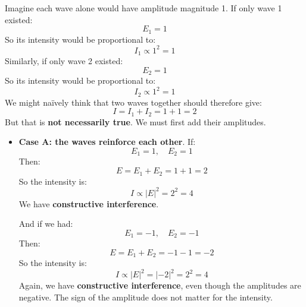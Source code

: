 \highspace
\begin{examplebox}
    Imagine each wave alone would have amplitude magnitude 1. If only wave 1 existed:
    \begin{equation*}
        E_1 = 1
    \end{equation*}
    So its intensity would be proportional to:
    \begin{equation*}
        I_1 \propto 1^{2} = 1
    \end{equation*}
    Similarly, if only wave 2 existed:
    \begin{equation*}
        E_2 = 1
    \end{equation*}
    So its intensity would be proportional to:
    \begin{equation*}
        I_2 \propto 1^{2} = 1
    \end{equation*}
    We might naïvely think that two waves together should therefore give:
    \begin{equation*}
        I = I_1 + I_2 = 1 + 1 = 2
    \end{equation*}
    But that is \textbf{not necessarily true}. We must first add their amplitudes.
    \begin{itemize}
        \item \textbf{Case A: the waves reinforce each other}. If:
            \begin{equation*}
                E_1 = 1, \quad E_2 = 1
            \end{equation*}
            Then:
            \begin{equation*}
                E = E_1 + E_2 = 1 + 1 = 2
            \end{equation*}
            So the intensity is:
            \begin{equation*}
                I \propto \left|E\right|^{2} = 2^{2} = 4
            \end{equation*}
            We have \textbf{constructive interference}.

            And if we had:
            \begin{equation*}
                E_1 = -1, \quad E_2 = -1
            \end{equation*}
            Then:
            \begin{equation*}
                E = E_1 + E_2 = -1 - 1 = -2
            \end{equation*}
            So the intensity is:
            \begin{equation*}
                I \propto \left|E\right|^{2} = \left|-2\right|^{2} = 2^{2} = 4
            \end{equation*}
            Again, we have \textbf{constructive interference}, even though the amplitudes are negative. The sign of the amplitude does not matter for the intensity.


\end{itemize}
\end{examplebox}
